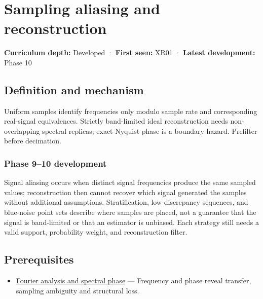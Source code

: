 \hypertarget{appendix-6a7869dd79a6}{}\label{referencestart:appendix-6a7869dd79a6}
\section{Sampling aliasing and reconstruction}\label{appendix-6a7869dd79a6-sampling-aliasing-and-reconstruction}

\textbf{Curriculum depth:} Developed · \textbf{First seen:} XR01 · \textbf{Latest development:} Phase 10

\begin{allmightroledefinition}

\subsection{Definition and mechanism}\label{appendix-6a7869dd79a6-definition-and-mechanism}

Uniform samples identify frequencies only modulo sample rate and corresponding real-signal equivalences. Strictly band-limited ideal reconstruction needs non-overlapping spectral replicas; exact-Nyquist phase is a boundary hazard. Prefilter before decimation.

\end{allmightroledefinition}

\subsubsection{Phase 9--10 development}\label{appendix-6a7869dd79a6-phase-910-development}

Signal aliasing occurs when distinct signal frequencies produce the same sampled values; reconstruction then cannot recover which signal generated the samples without additional assumptions. Stratification, low-discrepancy sequences, and blue-noise point sets describe where samples are placed, not a guarantee that the signal is band-limited or that an estimator is unbiased. Each strategy still needs a valid support, probability weight, and reconstruction filter.

\subsection{Prerequisites}\label{appendix-6a7869dd79a6-prerequisites}

\begin{itemize}
\tightlist
\item
  \hyperref[appendix-b60686ba06a1]{Fourier analysis and spectral phase} --- Frequency and phase reveal transfer, sampling ambiguity and structural loss.
\end{itemize}

